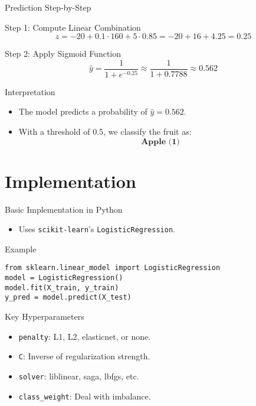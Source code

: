 \documentclass{beamer}
\begin{document}
\begin{frame}{Prediction Step-by-Step}
\begin{block}{Step 1: Compute Linear Combination}
\[
z = -20 + 0.1 \cdot 160 + 5 \cdot 0.85 = -20 + 16 + 4.25 = 0.25
\]
\end{block}

\begin{block}{Step 2: Apply Sigmoid Function}
\[
\hat{y} = \frac{1}{1 + e^{-0.25}} \approx \frac{1}{1 + 0.7788} \approx 0.562
\]
\end{block}
\end{frame}

\begin{frame}{Interpretation}
\begin{itemize}
  \item The model predicts a probability of \( \hat{y} = 0.562 \).
  \item With a threshold of 0.5, we classify the fruit as:
  \[
  \textbf{Apple (1)}
  \]
\end{itemize}
\end{frame}


\section{Implementation}

\begin{frame}[fragile]{Basic Implementation in Python}
\begin{itemize}
  \item Uses \texttt{scikit-learn}'s \texttt{LogisticRegression}.
\end{itemize}
\begin{block}{Example}
\begin{verbatim}
from sklearn.linear_model import LogisticRegression
model = LogisticRegression()
model.fit(X_train, y_train)
y_pred = model.predict(X_test)
\end{verbatim}
\end{block}
\end{frame}

\begin{frame}{Key Hyperparameters}
\begin{itemize}
  \item \texttt{penalty}: L1, L2, elasticnet, or none.
  \item \texttt{C}: Inverse of regularization strength.
  \item \texttt{solver}: liblinear, saga, lbfgs, etc.
  \item \texttt{class\_weight}: Deal with imbalance.
\end{itemize}
\end{frame}
\end{document}
